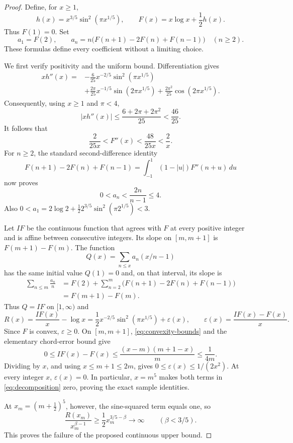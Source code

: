 \begin{proof}
Define, for $x\geq1$,
\[
 h(x)=x^{3/5}\sin^2(\pi x^{1/5}),\qquad
 F(x)=x\log x+\frac12h(x).
\]
Thus $F(1)=0$.  Set
\[
 a_1=F(2),\qquad
 a_n=n\bigl(F(n+1)-2F(n)+F(n-1)\bigr)\quad(n\geq2).
\tag{S2}\label{eq:explicit-coefficients}
\]
These formulas define every coefficient without a limiting choice.

We first verify positivity and the uniform bound.  Differentiation gives
\begin{align*}
 xh''(x)={}&-\frac6{25}x^{-2/5}\sin^2(\pi x^{1/5})\\
 &+\frac{2\pi}{25}x^{-1/5}\sin(2\pi x^{1/5})
   +\frac{2\pi^2}{25}\cos(2\pi x^{1/5}).
\end{align*}
Consequently, using $x\geq1$ and $\pi<4$,
\[
 |xh''(x)|\leq\frac{6+2\pi+2\pi^2}{25}<\frac{46}{25}.
\]
It follows that
\[
              \frac{2}{25x}<F''(x)<\frac{48}{25x}<\frac2x.
\tag{S3}\label{eq:convexity-bounds}
\]
For $n\geq2$, the standard second-difference identity
\[
 F(n+1)-2F(n)+F(n-1)
   =\int_{-1}^{1}(1-|u|)F''(n+u)\,du
\]
now proves
\[
            0<a_n<\frac{2n}{n-1}\leq4.
\]
Also $0<a_1=2\log2+\tfrac12 2^{3/5}\sin^2(\pi2^{1/5})<3$.

Let $IF$ be the continuous function that agrees with $F$ at every
positive integer and is affine between consecutive integers.  Its slope
on $[m,m+1]$ is $F(m+1)-F(m)$.  The function
\[
                  Q(x)=\sum_{n\leq x}a_n(x/n-1)
\]
has the same initial value $Q(1)=0$ and, on that interval, its slope is
\begin{align*}
 \sum_{n\leq m}\frac{a_n}{n}
 &=F(2)+\sum_{n=2}^{m}\bigl(F(n+1)-2F(n)+F(n-1)\bigr)\\
 &=F(m+1)-F(m).
\end{align*}
Thus $Q=IF$ on $[1,\infty)$ and
\[
 R(x)=\frac{IF(x)}x-\log x
     =\frac12x^{-2/5}\sin^2(\pi x^{1/5})+\varepsilon(x),
 \qquad
 \varepsilon(x)=\frac{IF(x)-F(x)}x.
\tag{S4}\label{eq:decomposition}
\]
Since $F$ is convex, $\varepsilon\geq0$.  On $[m,m+1]$,
\eqref{eq:convexity-bounds} and the elementary chord-error bound give
\[
0\leq IF(x)-F(x)
 \leq\frac{(x-m)(m+1-x)}m\leq\frac1{4m}.
\]
Dividing by $x$, and using $x\leq m+1\leq2m$, gives
$0\leq\varepsilon(x)\leq1/(2x^2)$.  At every integer $x$,
$\varepsilon(x)=0$.  In particular, $x=m^5$ makes both terms in
\eqref{eq:decomposition} zero, proving the exact sample identities.

At $x_m=(m+\tfrac12)^5$, however, the sine-squared term equals one, so
\[
             \frac{R(x_m)}{x_m^{\beta-1}}
                    \geq\frac12 x_m^{3/5-\beta}\longrightarrow\infty
                    \qquad(\beta<3/5).
\]
This proves the failure of the proposed continuous upper bound.


\end{proof}
